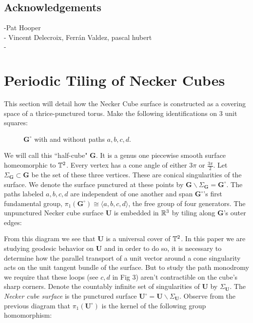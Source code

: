 \documentclass[]{article}
\def\bU{\mathbf{U}} \def\btU{\tilde{\bU}} \def\bUs{\bU^\circ}
\def\bG{\mathbf{G}} \def\bGs{\mathbf{G}^\circ}
\def\<{\langle} \def\>{\rangle}
\begin{document}
\subsection{Acknowledgements}
-Pat Hooper\\
- Vincent Delecroix, Ferrán Valdez, pascal hubert\\
- \\

\newpage

\section{Periodic Tiling of Necker Cubes}
This section will detail how the Necker Cube surface is constructed as a covering space of a thrice-punctured torus. Make the following identifications on 3 unit squares:
\begin{figure}[H]
\centering

\caption{$\bGs$ with and without paths $a,b,c,d$.}
\end{figure}

We will call this ``half-cube" $\bG$. It is a genus one piecewise smooth surface homeomorphic to $\mathbb{T}^2$. Every vertex has a cone angle of either $3\pi$ or $\frac{3\pi}{2}$. Let $\Sigma_{\bG}\subset\bG$ be the set of these three vertices. These are conical singularities of the surface. We denote the surface punctured at these points by $\bG\backslash\Sigma_{\bG} = \bGs$. The paths labeled $a,b,c,d$ are independent of one another and span $\bGs$'s first fundamental group, $\pi_1(\bGs)\cong \<a,b,c,d \>$, the free group of four generators. The unpunctured Necker cube surface $\bU$ is embedded in $\mathbb{R}^3$ by tiling along $\bG$'s outer edges:

\begin{figure}[H]
\centering

\end{figure}
From this diagram we see that $\bU$ is a universal cover of $\mathbb{T}^2$. In this paper we are studying geodesic behavior on $\bU$ and in order to do so, it is necessary to determine how the parallel transport of a unit vector around a cone singularity acts on the unit tangent bundle of the surface. But to study the path monodromy we require that these loops (see $c,d$ in Fig 3) aren't contractible on the cube's sharp corners. Denote the countably infinite set of singularities of $\bU$ by $\Sigma_{\bU}$. The \emph{Necker cube surface} is the punctured surface $\bUs=\bU\backslash\Sigma_{\bU}$. Observe from the previous diagram that $\pi_1(\bUs)$ is the kernel of the following group homomorphism:
\end{document}
